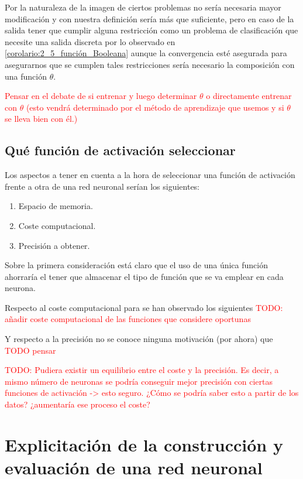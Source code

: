 Por la naturaleza de la imagen de ciertos problemas no sería necesaria mayor modificación y con nuestra definición sería más que suficiente, pero en caso de la salida tener que cumplir alguna restricción como  un problema de clasificación que necesite una salida discreta por lo observado en \ref{corolario:2_5_función_Booleana} aunque la convergencia esté asegurada para asegurarnos que se cumplen tales restricciones sería necesario la composición con una función $\theta$.

\textcolor{red}{Pensar en el debate de si entrenar y luego determinar $\theta$ o directamente entrenar con $\theta$ (esto vendrá determinado por el método de aprendizaje que usemos y si $\theta$ se lleva bien con él.)}


\subsection{Qué función de activación seleccionar}

Los aspectos a tener en cuenta a la hora de seleccionar una función 
de activación frente a otra de una red neuronal serían los siguientes:
\begin{enumerate}
    \item Espacio de memoria.
    \item Coste computacional.
    \item Precisión a obtener.
\end{enumerate}

Sobre la primera consideración está claro que el uso de una única función ahorraría el tener que almacenar el tipo de función que se va emplear en cada neurona.

Respecto al coste computacional para se han observado los siguientes
\textcolor{red}{TODO:  añadir coste computacional  de las funciones que considere oportunas}

Y respecto a la precisión no se conoce ninguna motivación (por ahora)
que \textcolor{red}{TODO pensar}

\textcolor{red}{TODO: Pudiera existir un equilibrio entre 
el coste y la precisión. Es decir, a mismo número de neuronas se podría conseguir mejor precisión con ciertas funciones de activación -> esto seguro. ¿Cómo se podría saber esto a partir de los datos? ¿aumentaría ese proceso el coste?}



\section{Explicitación de la construcción y evaluación de una red neuronal}

